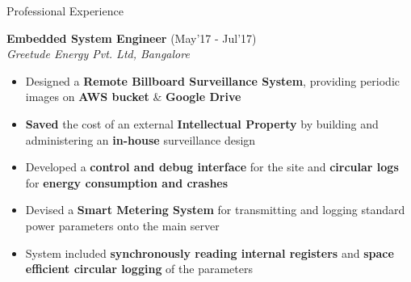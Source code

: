 \documentclass{resume}
\newcommand{\sepval}{-0.5em}
\begin{document}

\begin{rSection}{Professional Experience}

\vspace{-.4cm}
 
\item{\bf {\bf Embedded System Engineer}} \hfill{(May'17 - Jul'17)}\\

\emph{Greetude Energy Pvt. Ltd, Bangalore}\\ 
[-0.4cm]
  
\begin{itemize}[leftmargin=*]
    
	\itemsep \sepval


	\item Designed a {\bf Remote Billboard Surveillance System}, providing periodic images on {\bf AWS bucket} \& {\bf Google Drive} 

	\item {\bf Saved} the cost of an external {\bf Intellectual Property} by building and administering an {\bf in-house} surveillance design  

	\item Developed a {\bf control and debug interface} for the site and {\bf circular logs} for {\bf energy consumption and crashes}

	\item Devised a {\bf Smart Metering System} for transmitting and logging standard power parameters onto the main server
 
	\item System included {\bf synchronously reading internal registers} and {\bf space efficient circular logging} of the parameters
	
%
%
 
\end{itemize}

\end{rSection}
\end{document}
